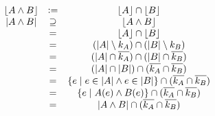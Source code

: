 \documentclass[a4paper,11pt,notitlepage]{scrreprt}
\begin{document}
\[\begin{array}{ccc}
		\lfloor A \wedge B \rfloor &\vcentcolon =& \lfloor A \rfloor \cap \lfloor B \rfloor\\
		|A \wedge B| &\supseteq& \lfloor A \wedge B \rfloor\\
		&=& \lfloor A \rfloor \cap \lfloor B \rfloor\\
		&=& (|A| \setminus k_A) \cap (|B| \setminus k_B)\\
		&=& (|A| \cap \overline{k_A}) \cap (|B| \cap \overline{k_B})\\
		&=& (|A| \cap |B|) \cap (\overline{k_A} \cap \overline{k_B})\\
		&=& \{e \mid e \in |A| \wedge e \in |B|\} \cap (\overline{k_A} \cap \overline{k_B})\\
		&=& \{e \mid A(e) \wedge B(e)\} \cap (\overline{k_A} \cap \overline{k_B})\\
		&=& |A \wedge B| \cap (\overline{k_A} \cap \overline{k_B})
\end{array}\]
\end{document}
